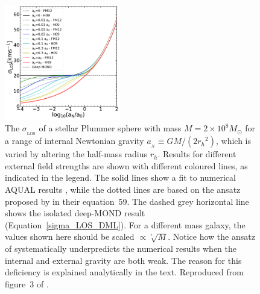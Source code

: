 \documentclass[fleqn,usenatbib,useAMS]{mnras} %
\begin{document}
\begin{figure}
	\centering
	\includegraphics[width=0.45\textwidth]{Haghi_2019_DF2_Figure_3}
	\caption{The $\sigma_{_\text{LOS}}$ of a stellar Plummer sphere \citep{Plummer_1911} with mass $M = 2 \times 10^8 M_\odot$ for a range of internal Newtonian gravity $a_{_N} \equiv GM/\left(2 {r_h}^2 \right)$, which is varied by altering the half-mass radius $r_h$. Results for different external field strengths are shown with different coloured lines, as indicated in the legend. The solid lines show a fit to numerical AQUAL results \citep{Haghi_2009}, while the dotted lines are based on the ansatz proposed by \citet{Famaey_McGaugh_2012} in their equation~59. The dashed grey horizontal line shows the isolated deep-MOND result (Equation~\ref{sigma_LOS_DML}). For a different mass galaxy, the values shown here should be scaled $\propto\sqrt[^4]{M}$. Notice how the ansatz of \citet{Famaey_McGaugh_2012} systematically underpredicts the numerical results when the internal and external gravity are both weak. The reason for this deficiency is explained analytically in the text. Reproduced from figure~3 of \citet{Haghi_2019_DF2}.}
	\label{Haghi_2019_DF2_Figure_3}
\end{figure}
\end{document}

